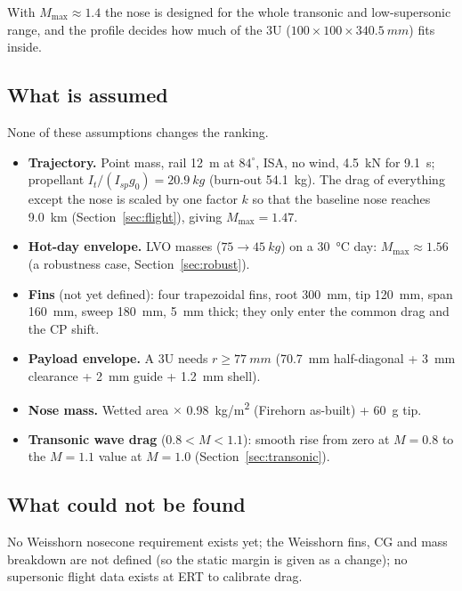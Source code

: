 \noindent With $M_{\max} \approx 1.4$ the nose is designed for the whole transonic and low-supersonic
range, and the profile decides how much of the 3U ($100\times100\times\SI{340.5}{mm}$) fits inside.

\subsection{What is assumed}

None of these assumptions changes the ranking.
\begin{itemize}[leftmargin=*,itemsep=2pt]
\item \textbf{Trajectory.} Point mass, rail \SI{12}{m} at $84^\circ$, ISA, no wind, \SI{4.5}{kN} for
\SI{9.1}{s}; propellant $I_t/(I_{sp}g_0) = \SI{20.9}{kg}$ (burn-out \SI{54.1}{kg}). The drag of everything
except the nose is scaled by one factor $k$ so that the baseline nose reaches \SI{9.0}{km}
(Section~\ref{sec:flight}), giving $M_{\max}=1.47$.
\item \textbf{Hot-day envelope.} LVO masses ($75 \rightarrow \SI{45}{kg}$) on a \SI{30}{\celsius} day:
$M_{\max} \approx 1.56$ (a robustness case, Section~\ref{sec:robust}).
\item \textbf{Fins} (not yet defined): four trapezoidal fins, root \SI{300}{mm}, tip \SI{120}{mm}, span
\SI{160}{mm}, sweep \SI{180}{mm}, \SI{5}{mm} thick; they only enter the common drag and the CP shift.
\item \textbf{Payload envelope.} A 3U needs $r \geq \SI{77}{mm}$ (\SI{70.7}{mm} half-diagonal +
\SI{3}{mm} clearance + \SI{2}{mm} guide + \SI{1.2}{mm} shell).
\item \textbf{Nose mass.} Wetted area $\times$ \SI{0.98}{kg/m^2} (Firehorn as-built) + \SI{60}{g} tip.
\item \textbf{Transonic wave drag} ($0.8 < M < 1.1$): smooth rise from zero at $M = 0.8$ to the
$M = 1.1$ value at $M = 1.0$ (Section~\ref{sec:transonic}).
\end{itemize}

\subsection{What could not be found}
\label{sec:flags}

No Weisshorn nosecone requirement exists yet; the Weisshorn fins, CG and mass breakdown are not defined
(so the static margin is given as a change); no supersonic flight data exists at ERT to calibrate drag.

